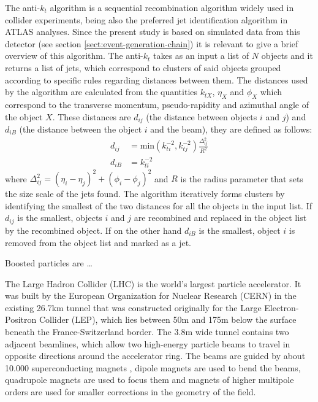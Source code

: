 \documentclass[main]{subfiles} %
\begin{document}
The anti-$k_t$ algorithm \cite{Cacciari2008} is a sequential recombination algorithm widely used in collider experiments, being also the preferred jet identification algorithm in ATLAS analyses. Since the present study is based on simulated data from this detector (see section \ref{sect:event-generation-chain}) it is relevant to give a brief overview of this algorithm. The anti-$k_t$ takes as an input a list of $N$ objects and it returns a list of jets, which correspond to clusters of said objects grouped according to specific rules regarding distances between them. The distances used by the algorithm are calculated from the quantities $k_{tX}$, $\eta_X$ and $\phi_X$ which correspond to the transverse momentum, pseudo-rapidity and azimuthal angle of the object $X$. These distances are $d_{ij}$ (the distance between objects $i$ and $j$) and $d_{iB}$ (the distance between the object $i$ and the beam), they are defined as follows:
\begin{align}
  d_{ij} &= \text{min}(k_{ti}^{-2},k_{tj}^{-2})\frac{\Delta_{ij}^2}{R^2}\\
  d_{iB} &= k_{ti}^{-2}
\end{align}
where $\Delta_{ij}^2 = (\eta_i - \eta_j)^2 + (\phi_i - \phi_j)^2$ and $R$ is the radius parameter that sets the size scale of the jets found. The algorithm iteratively forms clusters by identifying the smallest of the two distances for all the objects in the input list. If $d_{ij}$ is the smallest, objects $i$ and $j$ are recombined and replaced in the object list by the recombined object. If on the other hand $d_{iB}$ is the smallest, object $i$ is removed from the object list and marked as a jet.\\

\vspace{20pt}

Boosted particles are \dots 

\vspace{20pt}

\vspace{20pt}

\vspace{20pt}

\vspace{20pt}
The Large Hadron Collider (LHC) \cite{Evans2008} is the world's largest particle accelerator. It was built by the European Organization for Nuclear Research (CERN) in the existing 26.7\;km tunnel that was constructed originally for the Large Electron-Positron Collider (LEP), which lies between 50\;m and 175\;m below the surface beneath the France-Switzerland border. The 3.8\;m wide tunnel contains two adjacent beamlines, which allow two high-energy particle beams to travel in opposite directions around the accelerator ring. The beams are guided by about 10.000 superconducting magnets \cite{MYERS2013}, dipole magnets are used to bend the beams, quadrupole magnets are used to focus them and magnets of higher multipole orders are used for smaller corrections in the geometry of the field.\\
\end{document}
